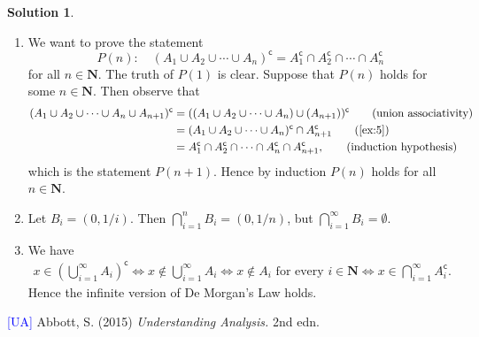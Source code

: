 \documentclass[12pt]{article}
\theoremstyle{definition}
\theoremstyle{exercise}
\theoremstyle{solution}
\newtheorem*{solution}{Solution}
\newcommand{\setcomp}[1]{#1^{\mathsf{c}}}
\begin{document}
\begin{solution}
    \begin{enumerate}[label = (\alph*)]
        \item We want to prove the statement
        \[
            P(n) : \quad \setcomp{(A_1 \cup A_2 \cup \cdots \cup A_n)} = \setcomp{A_1} \cap \setcomp{A_2} \cap \cdots \cap \setcomp{A_n}
        \]
        for all \( n \in \mathbf{N} \). The truth of \( P(1) \) is clear. Suppose that \( P(n) \) holds for some \( n \in \mathbf{N} \). Then observe that
        \begin{align*}
            \setcomp{(A_1 \cup A_2 \cup \cdots \cup A_n \cup A_{n+1})} &= \setcomp{((A_1 \cup A_2 \cup \cdots \cup A_n) \cup (A_{n+1}))} \tag{union associativity} \\
            &= \setcomp{(A_1 \cup A_2 \cup \cdots \cup A_n)} \cap \setcomp{A_{n+1}} \tag{\Cref{ex:5}} \\
            &= \setcomp{A_1} \cap \setcomp{A_2} \cap \cdots \cap \setcomp{A_n} \cap \setcomp{A_{n+1}}, \tag{induction hypothesis}
        \end{align*}
        which is the statement \( P(n+1) \). Hence by induction \( P(n) \) holds for all \( n \in \mathbf{N} \).

        \item Let \( B_i = (0, 1/i) \). Then \( \bigcap_{i=1}^{n} B_i = (0, 1/n) \), but \( \bigcap_{i=1}^{\infty} B_i = \emptyset \).

        \item We have
        \begin{gather*}
            x \in \setcomp{\left( \bigcup_{i=1}^{\infty} A_i \right)} \iff x \not\in \bigcup_{i=1}^{\infty} A_i \iff x \not\in A_i \text{ for every } i \in \mathbf{N} \iff x \in \bigcap_{i=1}^{\infty} \setcomp{A_i}.
        \end{gather*}
        Hence the infinite version of De Morgan's Law holds.
    \end{enumerate}
\end{solution}

\noindent \hrulefill

\noindent \hypertarget{ua}{\textcolor{blue}{[UA]} Abbott, S. (2015) \textit{Understanding Analysis.} 2nd edn.}
\end{document}
